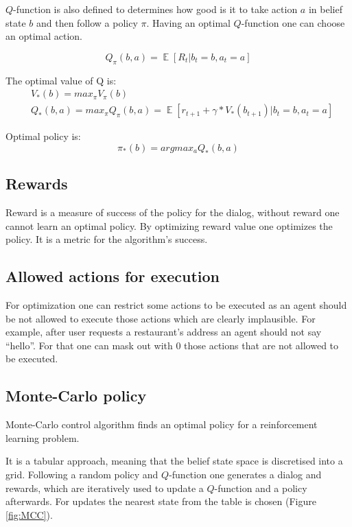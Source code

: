 \documentclass[12pt,titlepage,a4paper]{article}
\DeclareMathOperator*{\E}{\mathbb{E}}
\begin{document}
$Q$-function is also defined to determines how good is it to take action $a$ in belief state $b$ and then follow a policy $\pi$. Having an optimal $Q$-function one can choose an optimal action.

\begin{equation}
    Q_{\pi}(b, a) = \E[R_t| b_t = b, a_t = a]
\end{equation}

The optimal value of Q is:
\begin{align}
    &V_{*}(b) = max_{\pi}V_{\pi}(b) \\
    &Q_{*}(b, a) = max_{\pi}Q_{\pi}(b, a) = \E[r_{t+1} + \gamma * V_{*}(b_{t+1})| b_t = b, a_t = a]
\end{align}

Optimal policy is: 
\begin{equation}
    \pi_{*}(b) = argmax_{a} Q_{*}(b, a)
\end{equation}


\subsection{Rewards}
Reward is a measure of success of the policy for the dialog, without reward one cannot learn an optimal policy. By optimizing reward value one opti\-mizes the policy. It is a metric for the algorithm's success.

\subsection{Allowed actions for execution}

For optimization one can restrict some actions to be executed as an agent should be not allowed to execute those actions which are clearly implausible. For example, after user requests a restaurant's address an agent should not say ``hello”. For that one can mask out with 0 those actions that are not allowed to be executed.

\subsection{Monte-Carlo policy}

Monte-Carlo control algorithm finds an optimal policy for a reinforcement learning problem.

It is a tabular approach, meaning that the belief state space is discretised into a grid. Following a random policy and $Q$-function one generates a dialog and rewards, which are iteratively used to update a $Q$-function and a policy afterwards. For updates the nearest state from the table is chosen (Figure \ref{fig:MCC}). 
\end{document}

